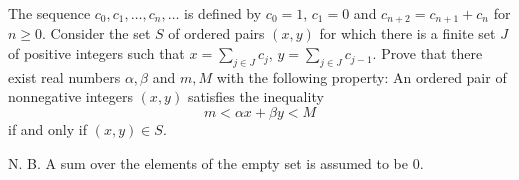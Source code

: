 The sequence $c_0, c_1, \ldots, c_n, \ldots$ is defined by $c_0 = 1$, $c_1 = 0$ and $c_{n+2} = c_{n+1} + c_n$ for $n \geq 0$. Consider the set $S$ of ordered pairs $(x, y)$ for which there is a finite set $J$ of positive integers such that $x = \sum_{j \in J} c_j$, $y = \sum_{j \in J} c_{j-1}$. Prove that there exist real numbers $\alpha, \beta$ and $m, M$ with the following property: An ordered pair of nonnegative integers $(x, y)$ satisfies the inequality
\[
m < \alpha x + \beta y < M
\]
if and only if $(x, y) \in S$.

N. B. A sum over the elements of the empty set is assumed to be $0$.
